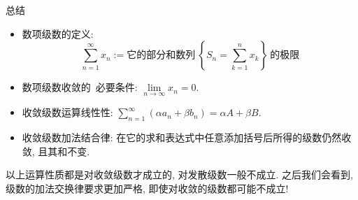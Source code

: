 \begin{frame}{总结}

\begin{itemize}
\item[{\larger[2] \color{red} \ding{43}}] 数项级数的定义:
\[\sum\limits_{n=1}^\infty x_n := \text{它的部分和数列} ~ \left\{ S_n = \sum\limits_{k=1}^n x_k \right\} ~ \text{的极限}\]
\pause
\vspace{0.4em}
\item[{\larger[2] \color{red} \ding{43}}] 数项级数收敛的~{\color{red}必要条件}: $\lim\limits_{n\to\infty} x_n = 0.$
\pause
\vspace{0.4em}
\item[{\larger[2] \color{red} \ding{43}}] 收敛级数运算线性性: $\sum\limits_{n=1}^\infty (\alpha a_n + \beta b_n) = \alpha A + \beta B.$
\pause
\vspace{0.4em}
\item[{\larger[2] \color{red} \ding{43}}] 收敛级数加法结合律: 在它的求和表达式中任意添加括号后所得的级数仍然收敛, 且其和不变.
\end{itemize}

\pause
\vspace{0.4em}

\begin{attnblock}
以上运算性质都是对收敛级数才成立的, 对发散级数一般不成立. 之后我们会看到, 级数的加法交换律要求更加严格, 即使对收敛的级数都可能不成立!
\end{attnblock}

\end{frame}









